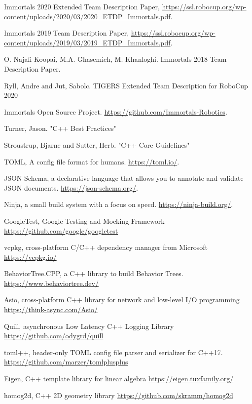 \documentclass[runningheads]{llncs}
\begin{document}
\newpage
\begin{thebibliography}{8}
Immortals 2020 Extended Team Description Paper, \url{https://ssl.robocup.org/wp-content/uploads/2020/03/2020\_ETDP\_Immortals.pdf}.

Immortals 2019 Team Description Paper, \url{https://ssl.robocup.org/wp-content/uploads/2019/03/2019\_ETDP\_Immortals.pdf}.

O. Najafi Koopai, M.A. Ghasemieh, M. Khanloghi. Immortals 2018 Team Description Paper.

Ryll, Andre and Jut, Sabolc. TIGERS Extended Team Description for RoboCup 2020


Immortals Open Source Project. \url{https://github.com/Immortals-Robotics}.

Turner, Jason. "C++ Best Practices"

Stroustrup, Bjarne and Sutter, Herb. "C++ Core Guidelines"

TOML, A config file format for humans. \url{https://toml.io/}.

JSON Schema, a declarative language that allows you to annotate and validate JSON documents. \url{https://json-schema.org/}.

Ninja, a small build system with a focus on speed. \url{https://ninja-build.org/}.

GoogleTest, Google Testing and Mocking Framework \url{https://github.com/google/googletest}

vcpkg, cross-platform C/C++ dependency manager from Microsoft \url{https://vcpkg.io/}

BehaviorTree.CPP, a C++ library to build Behavior Trees. \url{https://www.behaviortree.dev/}

Asio, cross-platform C++ library for network and low-level I/O programming \url{https://think-async.com/Asio/}

Quill, asynchronous Low Latency C++ Logging Library \url{https://github.com/odygrd/quill}

toml++, header-only TOML config file parser and serializer for C++17. \url{https://github.com/marzer/tomlplusplus}

Eigen, C++ template library for linear algebra \url{https://eigen.tuxfamily.org/}

homog2d, C++ 2D geometry library \url{https://github.com/skramm/homog2d}

\end{thebibliography}
\end{document}
